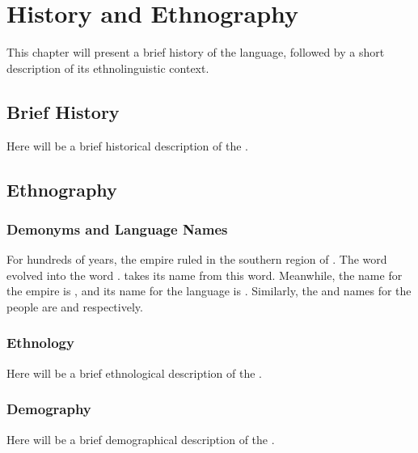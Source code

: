 \chapter{History and Ethnography}
\label{cha:ank-ethnography}

This chapter will present a brief history of the \langank{} language, followed by a short description of its ethnolinguistic context.

\section{Brief History}
\label{sec:ank-history}

Here will be a brief historical description of the \peopank.

\section{Ethnography}
\label{sec:ank-ethnography}

\subsection{Demonyms and Language Names}
\label{subsec:ank-demonyms}

For hundreds of years, the empire ruled in the southern region of \landn. The \langtvk{} word    evolved into the \langank{} word  . \fw{\nlangank}   takes its name from this word. Meanwhile, the \langrdk{} name for the empire is  , and its name for the \langank{} language is  . Similarly, the \langank{} and \langrdk{} names for the \langank{} people are \fw{\npeopank}  and   respectively.

\subsection{Ethnology}
\label{subsec:ank-ethnology}

Here will be a brief ethnological description of the \peopank.

\subsection{Demography}
\label{subsec:ank-demography}

Here will be a brief demographical description of the \peopank.